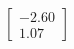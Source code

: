 \documentclass[preview]{standalone}
\begin{document}
\begin{align*}
\begin{bmatrix} -2.60 \\ 1.07 \end{bmatrix}
\end{align*}
\end{document}
